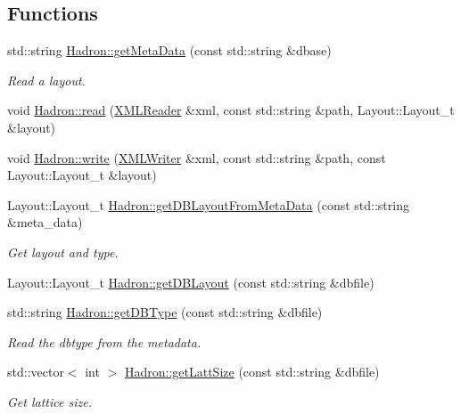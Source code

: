 \subsection*{Functions}
\begin{DoxyCompactItemize}
\item 
std\+::string \mbox{\hyperlink{namespaceHadron_a6c9f3d44d269357faf4d786cc73ec742}{Hadron\+::get\+Meta\+Data}} (const std\+::string \&dbase)
\begin{DoxyCompactList}\small\item\em Read a layout. \end{DoxyCompactList}\item 
void \mbox{\hyperlink{namespaceHadron_a2c6adb72eb12fa49cb7c0c7d15aa4aba}{Hadron\+::read}} (\mbox{\hyperlink{classADATXML_1_1XMLReader}{X\+M\+L\+Reader}} \&xml, const std\+::string \&path, Layout\+::\+Layout\+\_\+t \&layout)
\item 
void \mbox{\hyperlink{namespaceHadron_ae327bbb04efa053f7be135b73bb596a7}{Hadron\+::write}} (\mbox{\hyperlink{classADATXML_1_1XMLWriter}{X\+M\+L\+Writer}} \&xml, const std\+::string \&path, const Layout\+::\+Layout\+\_\+t \&layout)
\item 
Layout\+::\+Layout\+\_\+t \mbox{\hyperlink{namespaceHadron_a5f888183d0cbdadea2ebdf51020f5042}{Hadron\+::get\+D\+B\+Layout\+From\+Meta\+Data}} (const std\+::string \&meta\+\_\+data)
\begin{DoxyCompactList}\small\item\em Get layout and type. \end{DoxyCompactList}\item 
Layout\+::\+Layout\+\_\+t \mbox{\hyperlink{namespaceHadron_af18d764aba83c32e26a22d75ed2dfbf7}{Hadron\+::get\+D\+B\+Layout}} (const std\+::string \&dbfile)
\item 
std\+::string \mbox{\hyperlink{namespaceHadron_a82284ec1545a1a6b6794da8d973a1d57}{Hadron\+::get\+D\+B\+Type}} (const std\+::string \&dbfile)
\begin{DoxyCompactList}\small\item\em Read the dbtype from the metadata. \end{DoxyCompactList}\item 
std\+::vector$<$ int $>$ \mbox{\hyperlink{namespaceHadron_aa639c858514f322eb7ee4c074924746a}{Hadron\+::get\+Latt\+Size}} (const std\+::string \&dbfile)
\begin{DoxyCompactList}\small\item\em Get lattice size. \end{DoxyCompactList}\item 

\end{DoxyCompactItemize}
